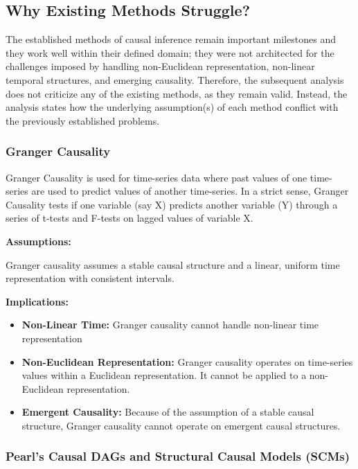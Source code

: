\documentclass{article}
\begin{document}
\newpage

\subsection{Why Existing Methods Struggle?}

The established methods of causal inference remain important milestones and they work well within their defined domain; they were not architected for the challenges imposed by handling non-Euclidean representation, non-linear temporal structures, and emerging causality. Therefore, the subsequent analysis does not criticize any of the existing methods, as they remain valid. Instead, the analysis states how the underlying assumption(s) of each method conflict with the previously established problems.

\subsubsection{Granger Causality}

Granger Causality\cite{granger1969causal} is used for time-series data where past values of one time-series are used to predict values of another time-series. In a strict sense, Granger Causality tests if one variable (say X) predicts another variable (Y) through a series of t-tests and F-tests on lagged values of variable X.

\textbf{Assumptions:}

Granger causality assumes a stable causal structure and a linear, uniform time representation with consistent intervals.

\textbf{Implications:}

\begin{itemize}
    \item \textbf{Non-Linear Time:} Granger causality cannot handle non-linear time representation
    \item \textbf{Non-Euclidean Representation:} Granger causality operates on time-series values within a Euclidean representation. It cannot be applied to a non-Euclidean representation.
    \item \textbf{Emergent Causality:} Because of the assumption of a stable causal structure, Granger causality cannot operate on emergent causal structures.
\end{itemize}


\subsubsection{Pearl's Causal DAGs and Structural Causal Models (SCMs)}
\end{document}
